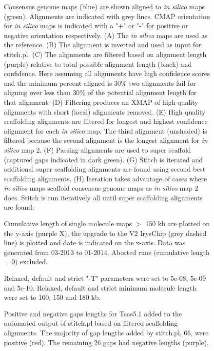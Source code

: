 \documentclass{bmcart}
\begin{document}
\begin{backmatter}
\begin{figure}[h!]
{      Consensus genome maps (blue) are shown aligned to \textit{in silico} maps (green). Alignments are indicated with grey lines. CMAP orientation for \textit{in silico} maps is indicated with a "+" or "-" for positive or negative orientation respectively. (A) The \textit{in silico} maps are used as the reference. (B) The alignment is inverted and used as input for stitch.pl. (C) The alignments are filtered based on alignment length (purple) relative to total possible alignment length (black) and confidence. Here assuming all alignments have high confidence scores and the minimum percent aligned is 30\% two alignments fail for aligning over less than 30\% of the potential alignment length for that alignment. (D) Filtering produces an XMAP of high quality alignments with short (local) alignments removed. (E) High quality scaffolding alignments are filtered for longest and highest confidence alignment for each \textit{in silico} map. The third alignment (unshaded) is filtered because the second alignment is the longest alignment for \textit{in silico} map 2. (F) Passing alignments are used to super scaffold (captured gaps indicated in dark green). (G) Stitch is iterated and additional super scaffolding alignments are found using second best scaffolding alignments. (H) Iteration takes advantage of cases where \textit{in silico} maps scaffold consensus genome maps as \textit{in silico} map 2 does. Stitch is run iteratively all until super scaffolding alignments are found.}
      \end{figure} 
\begin{figure}[h!]
	\caption{
 Cumulative length of single molecule maps $>$ 150 kb are plotted on the y-axis (purple X), the upgrade to the V2 IrysChip (grey dashed line) is plotted and date is indicated on the x-axis. Data was generated from 03-2013 to 01-2014. Aborted runs (cumulative length = 0) excluded. }
\end{figure}
\begin{figure}[h!]
	\caption{
 Relaxed, default and strict "-T" parameters were set to 5e-08, 5e-09 and 5e-10. Relaxed, default and strict minimum molecule length were set to 100, 150 and 180 kb.}
\end{figure}     
\begin{figure}[h!]
	\caption{
 Positive and negative gaps lengths for Tcas5.1 added to the automated output of stitch.pl based on filtered scaffolding alignments. The majority of gap lengths added by stitch.pl, 66, were positive (red). The remaining 26 gaps had negative lengths (purple).}

\end{figure}
\end{backmatter}
\end{document}
